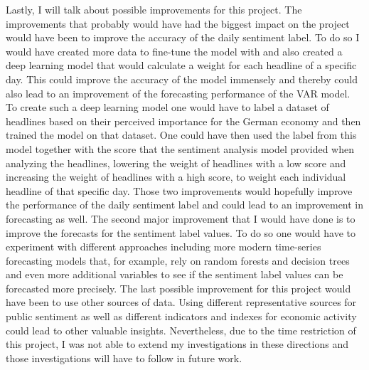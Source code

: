 \documentclass[11pt, a4paper, leqno]{article}
\begin{document}
Lastly, I will talk about possible improvements for this project.
The improvements that probably would have had the biggest impact on the project would have been to improve the accuracy of the daily sentiment label. To do so I would have created more data to fine-tune the model with and also created a deep learning model that would calculate a weight for each headline of a specific day. This could improve the accuracy of the model immensely and thereby could also lead to an improvement of the forecasting performance of the VAR model. To create such a deep learning model one would have to label a dataset of headlines based on their perceived importance for the German economy and then trained the model on that dataset. One could have then used the label from this model together with the score that the sentiment analysis model provided when analyzing the headlines, lowering the weight of headlines with a low score and increasing the weight of headlines with a high score, to weight each individual headline of that specific day. Those two improvements would hopefully improve the performance of the daily sentiment label and could lead to an improvement in forecasting as well.
The second major improvement that I would have done is to improve the forecasts for the sentiment label values. To do so one would have to experiment with different approaches including more modern time-series forecasting models that, for example, rely on random forests and decision trees and even more additional variables to see if the sentiment label values can be forecasted more precisely.
The last possible improvement for this project would have been to use other sources of data. Using different representative sources for public sentiment as well as different indicators and indexes for economic activity could lead to other valuable insights. Nevertheless, due to the time restriction of this project, I was not able to extend my investigations in these directions and those investigations will have to follow in future work.


\printbibliography
{}



\end{document}
